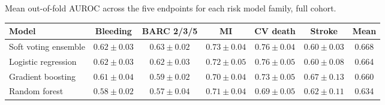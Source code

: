 \documentclass{article}
\begin{document}
\begin{table}[h]
\centering
Mean out-of-fold AUROC across the five endpoints for each risk
model family, full cohort.

\vspace{0.5em}

\begin{tabular}{lcccccc}
\toprule
Model & Bleeding & BARC 2/3/5 & MI & CV death & Stroke & Mean \\
\midrule
Soft voting ensemble & $0.62 \pm 0.03$ & $0.63 \pm 0.02$ & $0.73 \pm 0.04$ & $0.76 \pm 0.04$ & $0.60 \pm 0.03$ & 0.668 \\
Logistic regression   & $0.62 \pm 0.03$ & $0.62 \pm 0.03$ & $0.72 \pm 0.05$ & $0.76 \pm 0.05$ & $0.60 \pm 0.08$ & 0.664 \\
Gradient boosting     & $0.61 \pm 0.04$ & $0.59 \pm 0.02$ & $0.70 \pm 0.04$ & $0.73 \pm 0.05$ & $0.67 \pm 0.13$ & 0.660 \\
Random forest         & $0.58 \pm 0.02$ & $0.57 \pm 0.04$ & $0.71 \pm 0.04$ & $0.69 \pm 0.05$ & $0.62 \pm 0.11$ & 0.634 \\
\bottomrule
\end{tabular}
\end{table}
\end{document}

